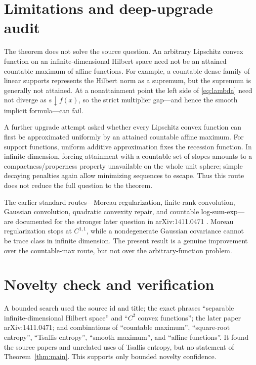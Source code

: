 \documentclass[11pt]{article}
\begin{document}
\section{Limitations and deep-upgrade audit}

The theorem does not solve the source question.  An arbitrary Lipschitz
convex function on an infinite-dimensional Hilbert space need not be an
attained countable maximum of affine functions.  For example, a countable
dense family of linear supports represents the Hilbert norm as a supremum,
but the supremum is generally not attained.  At a nonattainment point the
left side of \eqref{eq:lambda} need not diverge as $s\downarrow f(x)$, so the
strict multiplier gap---and hence the smooth implicit formula---can fail.

A further upgrade attempt asked whether every Lipschitz convex function can
first be approximated uniformly by an attained countable affine maximum.
For support functions, uniform additive approximation fixes the recession
function.  In infinite dimension, forcing attainment with a countable set of
slopes amounts to a compactness/properness property unavailable on the whole
unit sphere; simple decaying penalties again allow minimizing sequences to
escape.  Thus this route does not reduce the full question to the theorem.

The earlier standard routes---Moreau regularization, finite-rank convolution,
Gaussian convolution, quadratic convexity repair, and countable
log-sum-exp---are documented for the stronger later question in
arXiv:1411.0471 \cite{AzagraMudarra2014}.  Moreau regularization stops at
$C^{1,1}$, while a nondegenerate Gaussian covariance cannot be trace class in
infinite dimension.  The present result is a genuine improvement over the
countable-max route, but not over the arbitrary-function problem.

\section{Novelty check and verification}

A bounded search used the source id and title; the exact phrases
``separable infinite-dimensional Hilbert space'' and ``$C^2$ convex
functions''; the later paper arXiv:1411.0471; and combinations of
``countable maximum'', ``square-root entropy'', ``Tsallis entropy'',
``smooth maximum'', and ``affine functions''.  It found the source papers and
unrelated uses of Tsallis entropy, but no statement of
Theorem~\ref{thm:main}.  This supports only bounded novelty confidence.
\end{document}
